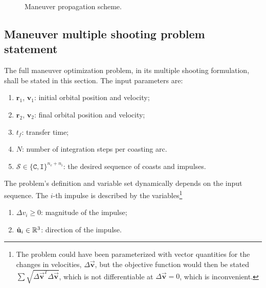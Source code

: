 \begin{figure}[htbp]
    \centering
    \caption{Maneuver propagation scheme.}
    \label{fig:maneuver_propagation}
\end{figure}


\subsection{Maneuver multiple shooting problem statement}

The full maneuver optimization problem, in its multiple shooting formulation, shall be stated in this section. The input parameters are:
\begin{enumerate}
    \item \(\mathbf{r}_1\), \(\mathbf{v}_1\): initial orbital position and velocity;
    \item \(\mathbf{r}_2\), \(\mathbf{v}_2\): final orbital position and velocity;
    \item \(t_f\): transfer time;
    \item \(N\): number of integration steps per coasting arc.
    \item \(\mathcal{S} \in \{\texttt{C}, \texttt{I}\}^{n_c + n_i}\): the desired sequence of coasts and impulses.
\end{enumerate}

The problem's definition and variable set dynamically depends on the input sequence. The \(i\)-th impulse is described by the variables\footnote{The problem could have been parameterized with vector quantities for the changes in velocities, \(\Delta \vec{\mathbf{v}}\), but the objective function would then be stated \(\sum \sqrt{\Delta \vec{\mathbf{v}}^T \Delta \vec{\mathbf{v}}}\), which is not differentiable at \(\Delta \vec {\mathbf{v}} = 0\), which is inconvenient.}
\begin{enumerate}
    \item \(\Delta v_i \geq 0\): magnitude of the impulse;
    \item \(\hat{\mathbf{u}}_i \in \mathbb{R}^3\): direction of the impulse.
\end{enumerate}

